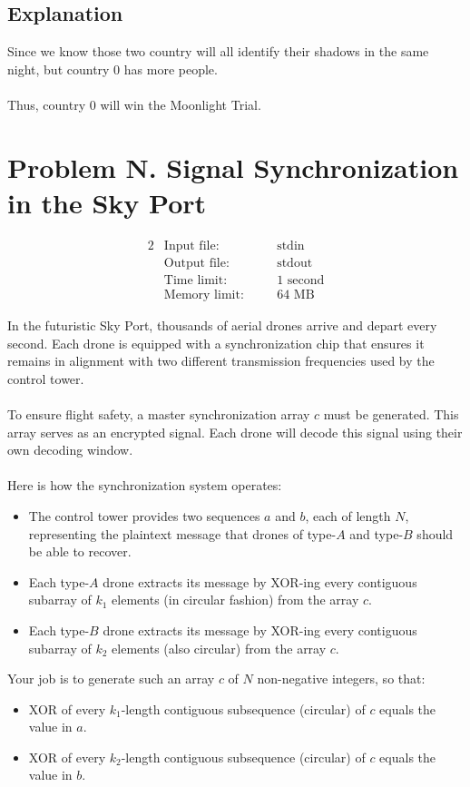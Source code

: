 \documentclass[12pt,a4paper]{article}
\begin{document}
\subsection*{\fontsize{16}{12}Explanation}
Since we know those two country will all identify their shadows in the same night, but country 0 has more people.
\\\\
\noindent
Thus, country 0 will win the Moonlight Trial.

\newpage
\section*{\fontsize{18}{12}Problem N. Signal Synchronization in the Sky Port}

\begin{alignat*}{2}
 &   \text{Input file:}   \quad     &&\text{stdin}\\
 &   \text{Output file:}  \quad     &&\text{stdout}\\
 &   \text{Time limit:}   \quad     &&\text{1 second}\\
 &   \text{Memory limit:} \quad     &&\text{64 MB}
\end{alignat*}

\noindent
In the futuristic Sky Port, thousands of aerial drones arrive and depart every second. Each drone is equipped with a synchronization chip that ensures it remains in alignment with two different transmission frequencies used by the control tower.
\\\\
\noindent
To ensure flight safety, a master synchronization array $c$ must be generated. This array serves as an encrypted signal. Each drone will decode this signal using their own decoding window.
\\\\
\noindent
Here is how the synchronization system operates:
\begin{itemize}
    \item The control tower provides two sequences $a$ and $b$, each of length $N$, representing the plaintext message that drones of type-$A$ and type-$B$ should be able to recover.
    \item Each type-$A$ drone extracts its message by XOR-ing every contiguous subarray of $k_1$ elements (in circular fashion) from the array $c$.
    \item Each type-$B$ drone extracts its message by XOR-ing every contiguous subarray of $k_2$ elements (also circular) from the array $c$.
\end{itemize}
\noindent
Your job is to generate such an array $c$ of $N$ non-negative integers, so that:
\begin{itemize}
    \item XOR of every $k_1$-length contiguous subsequence (circular) of $c$ equals the value in $a$.
    \item XOR of every $k_2$-length contiguous subsequence (circular) of $c$ equals the value in $b$.
\end{itemize}
\end{document}
